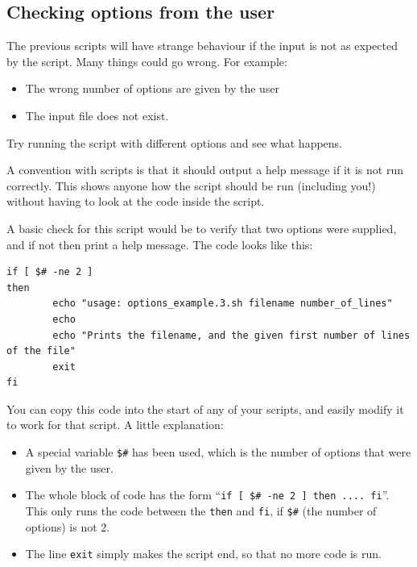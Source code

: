 \documentclass[11pt]{article}
\providecommand{\tightlist}{%
      \setlength{\itemsep}{0pt}\setlength{\parskip}{0pt}}
\begin{document}
    \hypertarget{checking-options-from-the-user}{%
\subsection{Checking options from the
user}\label{checking-options-from-the-user}}

The previous scripts will have strange behaviour if the input is not as
expected by the script. Many things could go wrong. For example:

\begin{itemize}
\tightlist
\item
  The wrong number of options are given by the user
\item
  The input file does not exist.
\end{itemize}

Try running the script with different options and see what happens.

A convention with scripts is that it should output a help message if it
is not run correctly. This shows anyone how the script should be run
(including you!) without having to look at the code inside the script.

A basic check for this script would be to verify that two options were
supplied, and if not then print a help message. The code looks like
this:

\begin{verbatim}
if [ $# -ne 2 ]
then
        echo "usage: options_example.3.sh filename number_of_lines"
        echo
        echo "Prints the filename, and the given first number of lines of the file"
        exit
fi
\end{verbatim}

You can copy this code into the start of any of your scripts, and easily
modify it to work for that script. A little explanation:

\begin{itemize}
\tightlist
\item
  A special variable \texttt{\$\#} has been used, which is the number of
  options that were given by the user.
\item
  The whole block of code has the form
  ``\texttt{if\ {[}\ \$\#\ -ne\ 2\ {]}\ then\ ....\ fi}''. This only
  runs the code between the \texttt{then} and \texttt{fi}, if
  \texttt{\$\#} (the number of options) is not 2.
\item
  The line \texttt{exit} simply makes the script end, so that no more
  code is run.
\end{itemize}
\end{document}
